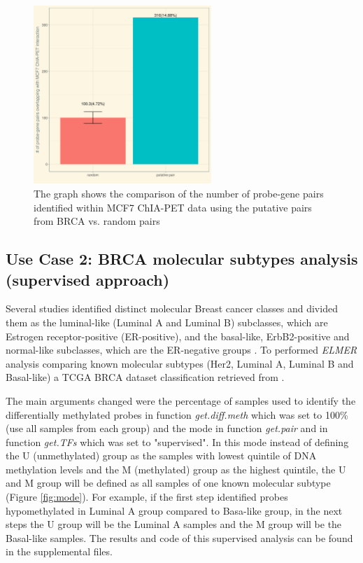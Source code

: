 %

\begin{figure}[ht!]
\centering
\includegraphics[width=0.6\textwidth]{images/validation.png}
\caption[MCF7 ChIA-PET validation]{\label{fig:chiapet} The graph shows the comparison of the number of probe-gene pairs identified within MCF7 ChIA-PET data using the putative pairs from BRCA vs. random pairs}
\end{figure}


\newpage
\subsection{Use Case 2: BRCA molecular subtypes analysis (supervised approach)}

Several studies identified distinct molecular Breast cancer classes and  divided them as the luminal-like (Luminal A and Luminal B) subclasses, which are Estrogen receptor-positive (ER-positive), and the basal-like, ErbB2-positive and normal-like subclasses, which are the ER-negative groups \cite{perou2000molecular,yersal2014biological,sorlie2001gene}.  To performed \textit{ELMER} analysis comparing known molecular subtypes (Her2, Luminal A, Luminal B and Basal-like) a TCGA BRCA dataset classification retrieved from .


The main arguments changed were the percentage of samples used to identify the differentially methylated probes in function \textit{get.diff.meth} which was set to 100\% (use all samples from each group) and the mode in function \textit{get.pair} and in function \textit{get.TFs} which was set to "supervised". In this mode instead of defining the U (unmethylated) group as the samples with lowest quintile of DNA methylation levels and the M (methylated) group as the highest quintile, the U and M group will be defined as all samples of one known molecular subtype (Figure \ref{fig:mode}). For example, if the first step identified probes hypomethylated in Luminal A group compared to Basa-like group, in the next steps the U group will be the Luminal A samples and the M group will be the Basal-like samples.
The results and code of this supervised analysis can be found in the supplemental files.

